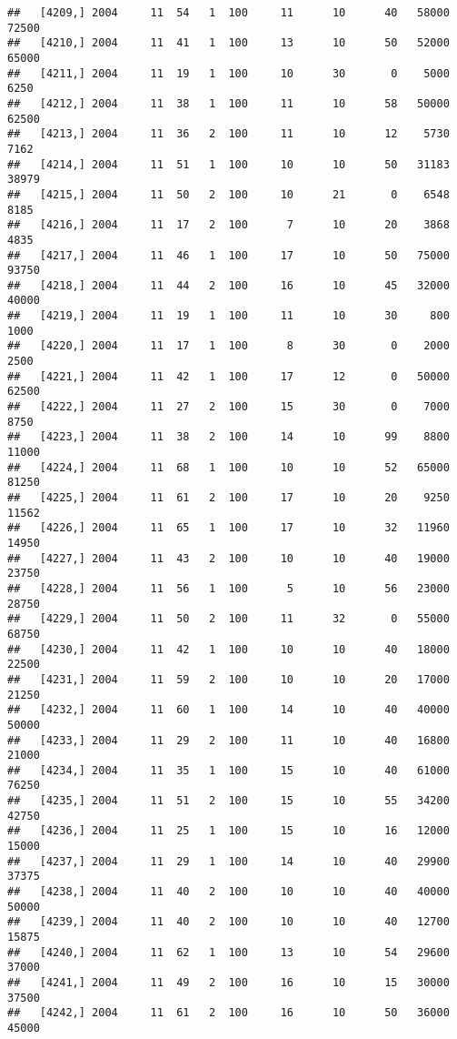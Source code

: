 \documentclass{article}\usepackage[]{graphicx}\usepackage[]{color}
\makeatletter
\newenvironment{kframe}{%
 \def\at@end@of@kframe{}%
 \ifinner\ifhmode%
  \def\at@end@of@kframe{\end{minipage}}%
  \begin{minipage}{\columnwidth}%
 \fi\fi%
 \def\FrameCommand##1{\hskip\@totalleftmargin \hskip-\fboxsep
 \colorbox{shadecolor}{##1}\hskip-\fboxsep
     \hskip-\linewidth \hskip-\@totalleftmargin \hskip\columnwidth}%
 \MakeFramed {\advance\hsize-\width
   \@totalleftmargin\z@ \linewidth\hsize
   \@setminipage}}%
 {\par\unskip\endMakeFramed%
 \at@end@of@kframe}
\newenvironment{knitrout}{}{} %
\makeatother
\begin{document}
\begin{knitrout}
\begin{kframe}
\begin{verbatim}
##   [4209,] 2004     11  54   1  100     11      10      40   58000   72500
##   [4210,] 2004     11  41   1  100     13      10      50   52000   65000
##   [4211,] 2004     11  19   1  100     10      30       0    5000    6250
##   [4212,] 2004     11  38   1  100     11      10      58   50000   62500
##   [4213,] 2004     11  36   2  100     11      10      12    5730    7162
##   [4214,] 2004     11  51   1  100     10      10      50   31183   38979
##   [4215,] 2004     11  50   2  100     10      21       0    6548    8185
##   [4216,] 2004     11  17   2  100      7      10      20    3868    4835
##   [4217,] 2004     11  46   1  100     17      10      50   75000   93750
##   [4218,] 2004     11  44   2  100     16      10      45   32000   40000
##   [4219,] 2004     11  19   1  100     11      10      30     800    1000
##   [4220,] 2004     11  17   1  100      8      30       0    2000    2500
##   [4221,] 2004     11  42   1  100     17      12       0   50000   62500
##   [4222,] 2004     11  27   2  100     15      30       0    7000    8750
##   [4223,] 2004     11  38   2  100     14      10      99    8800   11000
##   [4224,] 2004     11  68   1  100     10      10      52   65000   81250
##   [4225,] 2004     11  61   2  100     17      10      20    9250   11562
##   [4226,] 2004     11  65   1  100     17      10      32   11960   14950
##   [4227,] 2004     11  43   2  100     10      10      40   19000   23750
##   [4228,] 2004     11  56   1  100      5      10      56   23000   28750
##   [4229,] 2004     11  50   2  100     11      32       0   55000   68750
##   [4230,] 2004     11  42   1  100     10      10      40   18000   22500
##   [4231,] 2004     11  59   2  100     10      10      20   17000   21250
##   [4232,] 2004     11  60   1  100     14      10      40   40000   50000
##   [4233,] 2004     11  29   2  100     11      10      40   16800   21000
##   [4234,] 2004     11  35   1  100     15      10      40   61000   76250
##   [4235,] 2004     11  51   2  100     15      10      55   34200   42750
##   [4236,] 2004     11  25   1  100     15      10      16   12000   15000
##   [4237,] 2004     11  29   1  100     14      10      40   29900   37375
##   [4238,] 2004     11  40   2  100     10      10      40   40000   50000
##   [4239,] 2004     11  40   2  100     10      10      40   12700   15875
##   [4240,] 2004     11  62   1  100     13      10      54   29600   37000
##   [4241,] 2004     11  49   2  100     16      10      15   30000   37500
##   [4242,] 2004     11  61   2  100     16      10      50   36000   45000

\end{verbatim}
\end{kframe}
\end{knitrout}
\end{document}
